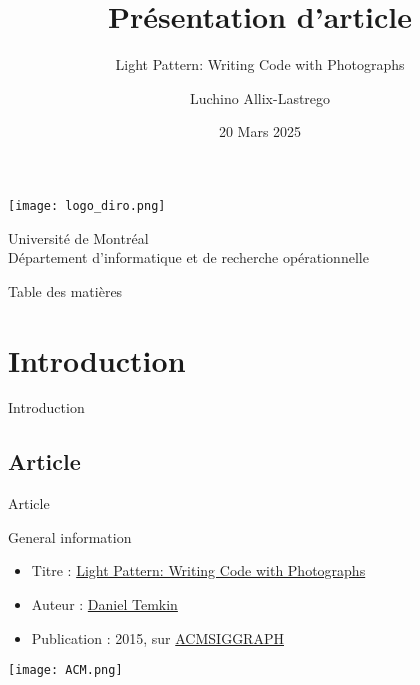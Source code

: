 \documentclass[xcolor={dvipsnames,svgnames}]{beamer}
\title{Présentation d'article}
\subtitle{Light Pattern: Writing Code with Photographs}
\author{Luchino Allix-Lastrego}
\institute{6251 - Art algorithmique}
\date{20 Mars 2025}
\begin{document}
\begin{frame}
	\titlepage
	\begin{center}
		\texttt{[image: logo\_diro.png]}

		\vspace{0.3cm}

		Université de Montréal\\
		Département d'informatique et de recherche opérationnelle\\

	\end{center}
\end{frame}

\begin{frame}{Table des matières}
	\tableofcontents
\end{frame}

\section{Introduction}
\begin{frame}
	\centering
	\Large Introduction
\end{frame}

\subsection{Article}
\begin{frame}{Article}
	\begin{block}{General information}
		\begin{itemize}
			\item Titre : \href{https://history.siggraph.org/wp-content/uploads/2018/04/2015_Temkin_LightPattern.pdf}{Light Pattern: Writing Code with Photographs}
			\item Auteur : \href{https://danieltemkin.com/}{Daniel Temkin}
			\item Publication : 2015, sur \href{https://history.siggraph.org/}{ACMSIGGRAPH}
		\end{itemize}
	\end{block}

	\hfill

	\begin{center}
		\texttt{[image: ACM.png]}
	\end{center}
	
\end{frame}
\end{document}
